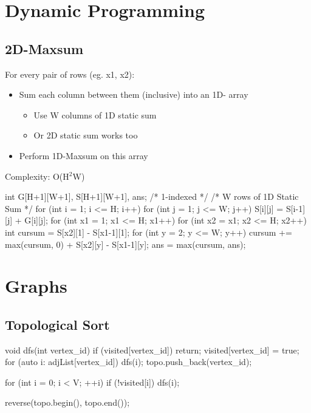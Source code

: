 \documentclass{article}
\begin{document}
\section{Dynamic Programming}
\subsection{2D-Maxsum}
For every pair of rows (eg. x1, x2):
\begin{itemize}
  \item Sum each column between them (inclusive) into an 1D-
array
    \begin{itemize}
        \item Use W columns of 1D static sum
        \item Or 2D static sum works too
    \end{itemize}

  \item Perform 1D-Maxsum on this array
\end{itemize}
Complexity: O(H$^2$W)

\begin{mylisting}{}
int G[H+1][W+1], S[H+1][W+1], ans; /* 1-indexed */
/* W rows of 1D Static Sum */
for (int i = 1; i <= H; i++) 
    for (int j = 1; j <= W; j++) 
        S[i][j] = S[i-1][j] + G[i][j];
for (int x1 = 1; x1 <= H; x1++) {
    for (int x2 = x1; x2 <= H; x2++) {
        int cursum = S[x2][1] - S[x1-1][1];
        for (int y = 2; y <= W; y++) {
            cursum += max(cursum, 0) + S[x2][y] - S[x1-1][y];
            ans = max(cursum, ans);
        }
    }
}
\end{mylisting}


\section{Graphs}
\subsection{Topological Sort}
\begin{mylisting}{}
void dfs(int vertex_id) {
	if (visited[vertex_id]) return;
	visited[vertex_id] = true;
	for (auto i: adjList[vertex_id]) {
		dfs(i);
	}
	topo.push_back(vertex_id);
}

for (int i = 0; i < V; ++i)
	if (!visited[i]) dfs(i);
	
reverse(topo.begin(), topo.end());
\end{mylisting}
\end{document}
